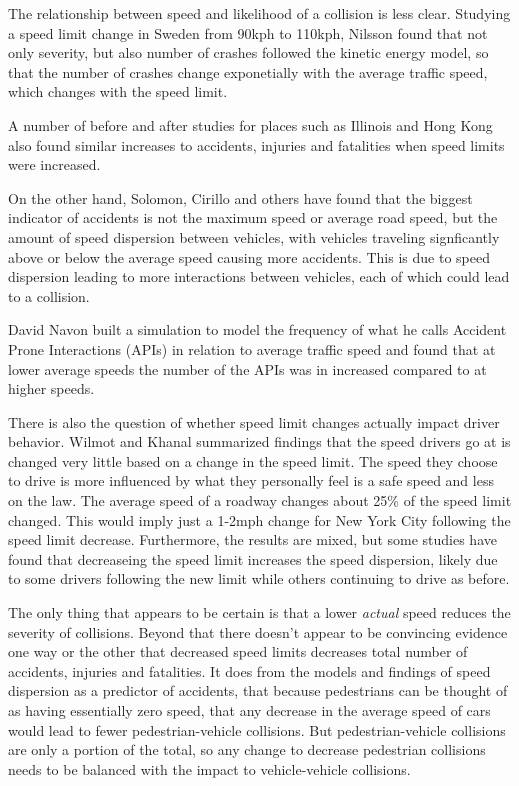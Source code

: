 \documentclass[10pt,journal,compsoc]{IEEEtran}
\begin{document}
The relationship between speed and likelihood of a collision is less clear. Studying a speed limit change in Sweden from 90kph to 110kph, Nilsson found that not only severity, but also number of crashes followed the kinetic energy model, so that the number of crashes change exponetially with the average traffic speed, which changes with the speed limit\cite{aarts2006driving}.  

A number of before and after studies for places such as Illinois\cite{rock1995impact} and Hong Kong\cite{wong2005would} also found similar increases to accidents, injuries and fatalities when speed limits were increased.

On the other hand, Solomon, Cirillo and others have found that the biggest indicator of accidents is not the maximum speed or average road speed, but the amount of speed dispersion between vehicles, with vehicles traveling signficantly above or below the average speed causing more accidents\cite{aarts2006driving}.  This is due to speed dispersion leading to more interactions between vehicles, each of which could lead to a collision.  

David Navon built a simulation to model the frequency of what he calls Accident Prone Interactions (APIs)  in relation to average traffic speed and found that at lower average speeds the number of the APIs was in increased compared to at higher speeds\cite{navon2003paradox}.  

There is also the question of whether speed limit changes actually impact driver behavior.  Wilmot and Khanal summarized findings that the speed drivers go at is changed very little based on a change in the speed limit.  The speed they choose to drive is more influenced by what they personally feel is a safe speed and less on the law.  The average speed of a roadway changes about 25\% of the speed limit changed.  This would imply just a 1-2mph change for New York City following the speed limit decrease.  Furthermore, the results are mixed, but some studies have found that decreaseing the speed limit increases the speed dispersion, likely due to some drivers following the new limit while others continuing to drive as before\cite{wilmot1999effect}.

The only thing that appears to be certain is that a lower \textit{actual} speed reduces the severity of collisions.  Beyond that there doesn't appear to be convincing evidence one way or the other that decreased speed limits decreases total number of accidents, injuries and fatalities.  It does from the models and findings of speed dispersion as a predictor of accidents, that because pedestrians can be thought of  as having essentially zero speed, that any decrease in the average speed of cars would lead to fewer pedestrian-vehicle collisions.  But pedestrian-vehicle collisions are only a portion of the total, so any change to decrease pedestrian collisions needs to be balanced with the impact to vehicle-vehicle collisions.
\end{document}
